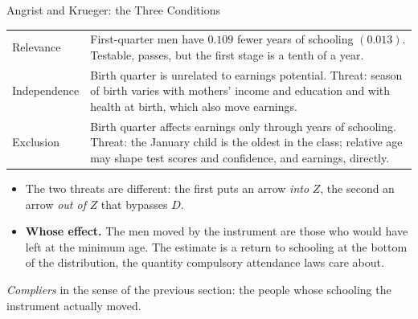 \documentclass[aspectratio=169,11pt,xcolor=dvipsnames]{beamer}
\begin{document}
\begin{frame}{Angrist and Krueger: the Three Conditions}
\begin{center}\footnotesize
\renewcommand{\arraystretch}{1.15}
\begin{tabular}{@{}lp{10.6cm}@{}}
\toprule
Relevance & First-quarter men have $0.109$ fewer years of schooling
  $(0.013)$. \alert{Testable, passes}, but the first stage is a tenth of a
  year. \\
Independence & Birth quarter is unrelated to earnings potential. Threat:
  season of birth varies with mothers' income and education and with
  health at birth, which also move earnings. \\
Exclusion & Birth quarter affects earnings only through years of schooling.
  Threat: the January child is the oldest in the class; relative age may
  shape test scores and confidence, and earnings, directly. \\
\bottomrule
\end{tabular}
\end{center}
\begin{itemize}\itemsep2pt
  \item The two threats are different: the first puts an arrow \emph{into}
        $Z$, the second an arrow \emph{out of} $Z$ that bypasses $D$.
  \item \textbf{Whose effect.} The men moved by the instrument are those who
        would have left at the minimum age. The estimate is a return to
        schooling at the bottom of the distribution, the quantity compulsory
        attendance laws care about.
\end{itemize}
{\footnotesize \emph{Compliers} in the sense of the previous section: the people
whose schooling the instrument actually moved.}
\end{frame}
\end{document}
